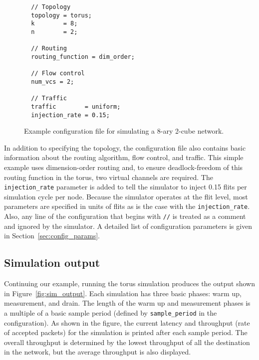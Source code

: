 \documentclass[11pt]{article}
\begin{document}
\begin{figure}
\begin{verbatim}
  // Topology
  topology = torus;
  k        = 8;
  n        = 2;

  // Routing
  routing_function = dim_order;

  // Flow control
  num_vcs = 2;

  // Traffic
  traffic        = uniform;
  injection_rate = 0.15;
\end{verbatim}
\caption{Example configuration file for simulating a 8-ary 2-cube
network.}
\label{fig:config_example}
\end{figure}

In addition to specifying the topology, the configuration file also
contains basic information about the routing algorithm, flow control,
and traffic.  This simple example uses dimension-order routing and, to
ensure deadlock-freedom of this routing function in the torus, two
virtual channels are required.  The \texttt{injection\_rate} parameter
is added to tell the simulator to inject 0.15 flits per simulation
cycle per node.  Because the simulator operates at the flit level,
most parameters are specified in units of flits as is the case with
the \texttt{injection\_rate}.  Also, any line of the configuration
that begins with \texttt{//} is treated as a comment and ignored by
the simulator.  A detailed list of configuration parameters is given in
Section~\ref{sec:config_params}.

\subsection{Simulation output}

Continuing our example, running the torus simulation produces the
output shown in Figure~\ref{fig:sim_output}.  Each simulation has
three basic phases: warm up, measurement, and drain.  The length of
the warm up and measurement phases is a multiple of a basic sample
period (defined by \texttt{sample\_period} in the configuration).  As
shown in the figure, the current latency and throughput (rate of
accepted packets) for the simulation is printed after each sample
period.  The overall throughput is determined by the lowest throughput
of all the destination in the network, but the average throughput is
also displayed.
\end{document}
